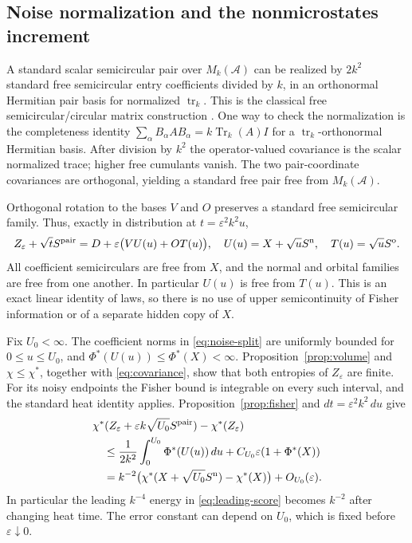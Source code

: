 \documentclass[11pt]{article}
\theoremstyle{definition}\newtheorem{definition}[theorem]{Definition}
\theoremstyle{remark}\newtheorem{remark}[theorem]{Remark}
\DeclareMathOperator{\Tr}{Tr}\DeclareMathOperator{\tr}{tr}
\newcommand{\eps}{\varepsilon}\newcommand{\id}{\mathrm{id}}
\begin{document}
\subsection{Noise normalization and the nonmicrostates increment}
A standard scalar semicircular pair over $M_k(\mathcal A)$ can be
realized by $2k^2$ standard free semicircular entry coefficients divided
by $k$, in an orthonormal Hermitian pair basis for normalized $\tr_k$.
This is the classical free semicircular/circular matrix construction
\cite{Vmatrix}. One way to check the normalization is the completeness
identity $\sum_\alpha B_\alpha A B_\alpha=k\Tr_k(A)I$ for a
$\tr_k$-orthonormal Hermitian basis. After division by $k^2$ the
operator-valued covariance is the scalar normalized trace; higher
free cumulants vanish. The two pair-coordinate covariances are
orthogonal, yielding a standard free pair free from $M_k(\mathcal A)$.

Orthogonal rotation to the bases $V$ and $O$ preserves a standard free
semicircular family. Thus, exactly in distribution at
$t=\eps^2k^2u$,
\begin{equation}\label{eq:noise-split}
 Z_\eps+\sqrt t S^{\rm pair}
 =D+\eps\big(VU(u)+OT(u)\big),\quad
 U(u)=X+\sqrt u S^{\rm n},\quad T(u)=\sqrt u S^{\rm o}.
\end{equation}
All coefficient semicirculars are free from $X$, and the normal and
orbital families are free from one another. In particular $U(u)$ is
free from $T(u)$. This is an exact linear identity of laws, so there is
no use of upper semicontinuity of Fisher information or of a separate
hidden copy of $X$.

Fix $U_0<\infty$. The coefficient norms in \eqref{eq:noise-split} are
uniformly bounded for $0\leq u\leq U_0$, and
$\Phi^*(U(u))\leq\Phi^*(X)<\infty$. Proposition~\ref{prop:volume}
and $\chi\leq\chi^*$, together with \eqref{eq:covariance}, show that
both entropies of $Z_\eps$ are finite. For its noisy endpoints the
Fisher bound is integrable on every such interval, and the standard
heat identity applies. Proposition~\ref{prop:fisher} and
$dt=\eps^2k^2\,du$ give
\begin{align}
 &\chi^*(Z_\eps+\eps k\sqrt{U_0}S^{\rm pair})-\chi^*(Z_\eps)
 \notag\\
 &\quad\leq\frac1{2k^2}\int_0^{U_0}\Phi^*(U(u))\,du
                +C_{U_0}\eps(1+\Phi^*(X))\notag\\
 &\quad=k^{-2}\big(\chi^*(X+\sqrt{U_0}S^{\rm n})-\chi^*(X)\big)
                +O_{U_0}(\eps).
 \label{eq:star-increment}
\end{align}
In particular the leading $k^{-4}$ energy in
\eqref{eq:leading-score} becomes $k^{-2}$ after changing heat time.
The error constant can depend on $U_0$, which is fixed before
$\eps\downarrow0$.
\end{document}
